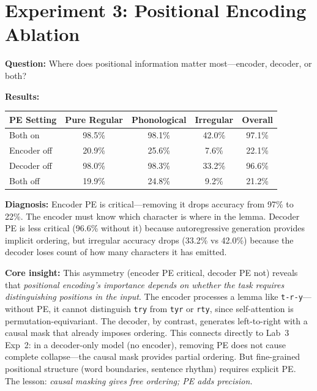 \section{Experiment 3: Positional Encoding Ablation}

\textbf{Question:} Where does positional information matter most---encoder, decoder, or both?

\textbf{Results:}

\begin{center}
\begin{tabular}{lcccc}
\toprule
\textbf{PE Setting} & \textbf{Pure Regular} & \textbf{Phonological} & \textbf{Irregular} & \textbf{Overall} \\
\midrule
Both on & 98.5\% & 98.1\% & 42.0\% & 97.1\% \\
Encoder off & 20.9\% & 25.6\% & 7.6\% & 22.1\% \\
Decoder off & 98.0\% & 98.3\% & 33.2\% & 96.6\% \\
Both off & 19.9\% & 24.8\% & 9.2\% & 21.2\% \\
\bottomrule
\end{tabular}
\end{center}

\textbf{Diagnosis:} Encoder PE is critical---removing it drops accuracy from 97\% to 22\%. The encoder must know which character is where in the lemma. Decoder PE is less critical (96.6\% without it) because autoregressive generation provides implicit ordering, but irregular accuracy drops (33.2\% vs 42.0\%) because the decoder loses count of how many characters it has emitted.

\textbf{Core insight:} This asymmetry (encoder PE critical, decoder PE not) reveals that \emph{positional encoding's importance depends on whether the task requires distinguishing positions in the input}. The encoder processes a lemma like \texttt{t-r-y}---without PE, it cannot distinguish \texttt{try} from \texttt{tyr} or \texttt{rty}, since self-attention is permutation-equivariant. The decoder, by contrast, generates left-to-right with a causal mask that already imposes ordering. This connects directly to Lab~3 Exp~2: in a decoder-only model (no encoder), removing PE does not cause complete collapse---the causal mask provides partial ordering. But fine-grained positional structure (word boundaries, sentence rhythm) requires explicit PE. The lesson: \emph{causal masking gives free ordering; PE adds precision.}

